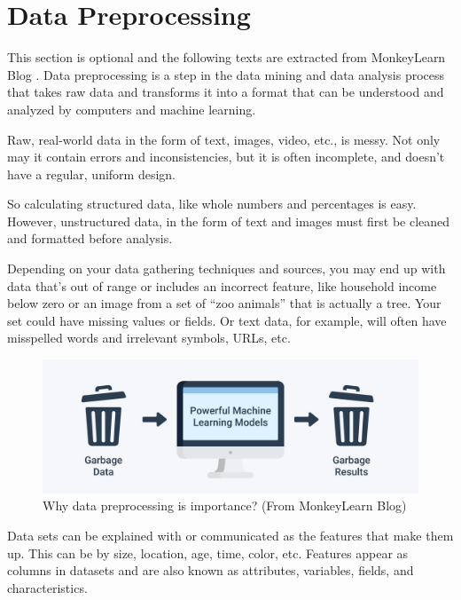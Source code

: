 \documentclass[12pt]{article}  %
\begin{document}
 
 
 \section{Data Preprocessing}
 
 This section is optional and the following texts are extracted from MonkeyLearn Blog \cite{Mesevage2021}. Data preprocessing is a step in the data mining and data analysis process that takes raw data and transforms it into a format that can be understood and analyzed by computers and machine learning.
 
 Raw, real-world data in the form of text, images, video, etc., is messy. Not only may it contain errors and inconsistencies, but it is often incomplete, and doesn’t have a regular, uniform design.
 
 So calculating structured data, like whole numbers and percentages is easy. However, unstructured data, in the form of text and images must first be cleaned and formatted before analysis.
 
 Depending on your data gathering techniques and sources, you may end up with data that’s out of range or includes an incorrect feature, like household income below zero or an image from a set of “zoo animals” that is actually a tree. Your set could have missing values or fields. Or text data, for example, will often have misspelled words and irrelevant symbols, URLs, etc.
 
 \begin{figure}[htbp]  %
     
     \centering  %
     \includegraphics[width=.7\textwidth]{DataProc.jpg} %
     \caption{Why data preprocessing is importance? (From MonkeyLearn Blog)} %
     \label{fig2}%
 \end{figure}
  
 
 Data sets can be explained with or communicated as the features that make them up. This can be by size, location, age, time, color, etc. Features appear as columns in datasets and are also known as attributes, variables, fields, and characteristics. 
 
\end{document}
